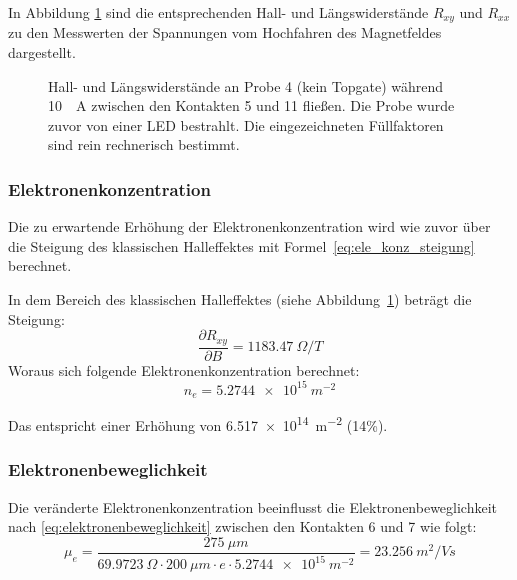 \documentclass[a4paper]{article}
\begin{document}
In Abbildung \ref{fig:magnetotransport_led} sind die
entsprechenden Hall- und Längswiderstände $R_{xy}$ und $R_{xx}$
zu den Messwerten der Spannungen vom Hochfahren des Magnetfeldes dargestellt.

\begin{figure}[h!]
  \begin{center}
      
  \end{center}
  \caption{
	Hall- und Längswiderstände an Probe 4 (kein Topgate)
	während \SI{10}{\micro{}A} zwischen den Kontakten 5 und 11 fließen.
	Die Probe wurde zuvor von einer LED bestrahlt.
	Die eingezeichneten Füllfaktoren sind rein rechnerisch bestimmt.}
  \label{fig:magnetotransport_led}
\end{figure}


\subsubsection*{Elektronenkonzentration}
Die zu erwartende Erhöhung der Elektronenkonzentration wird wie zuvor
über die Steigung des klassischen Halleffektes mit
Formel~\eqref{eq:ele_konz_steigung} berechnet.

In dem Bereich des klassischen Halleffektes
(siehe Abbildung~\ref{fig:magnetotransport_led}) beträgt die Steigung:
\begin{equation*}
\frac{\partial R_{xy}}{\partial B} = \SI{1183,47}{\Omega/T}
\end{equation*}
Woraus sich folgende Elektronenkonzentration berechnet:
\begin{equation*} n_e = \SI{5,2744e15}{m^{-2}} \end{equation*}

Das entspricht einer Erhöhung von \SI{6,517e14}{m^{-2}} (14\%).

\subsubsection*{Elektronenbeweglichkeit}

Die veränderte Elektronenkonzentration beeinflusst 
die Elektronenbeweglichkeit nach \eqref{eq:elektronenbeweglichkeit} 
zwischen den Kontakten 6 und 7 wie folgt:
\begin{equation*}
\mu_e = \frac{ \SI{275}{\mu m} }
 	     {\SI{69,9723}{\Omega} \cdot \SI{200}{\mu m} \cdot e \cdot \SI{5,2744e15}{m^{-2}}}
      = \SI{23.256}{m^2 / Vs}
\end{equation*}

\end{document}
